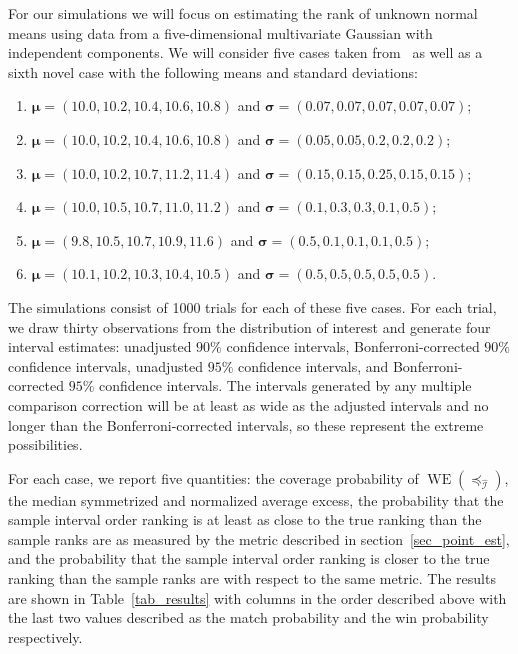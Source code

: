 \documentclass[12pt]{article}
\newcommand{\iord}{{\preceq_{\hat{\mathcal{I}}}}}
\newcommand{\WE}[1]{\operatorname{WE}(#1)}
\numberwithin{theorem}{section}
\begin{document}
For our simulations  we will focus on estimating the rank of unknown normal means using data from a five-dimensional multivariate Gaussian with independent components.  We will consider five cases taken from~\cite{klein2011rankingNormal} as well as a sixth novel case with the following means and standard deviations:
\begin{enumerate}

\item $\bm{\mu} = (10.0, 10.2, 10.4, 10.6, 10.8)$ and $\bm{\sigma} = (0.07, 0.07, 0.07, 0.07, 0.07)$;

\item $\bm{\mu} = (10.0, 10.2, 10.4, 10.6, 10.8)$ and $\bm{\sigma} = (0.05, 0.05, 0.2, 0.2, 0.2)$;

\item $\bm{\mu} = (10.0, 10.2, 10.7, 11.2, 11.4)$ and $\bm{\sigma} = (0.15, 0.15, 0.25, 0.15, 0.15)$;

\item $\bm{\mu} = (10.0, 10.5, 10.7, 11.0, 11.2)$ and $\bm{\sigma} = (0.1, 0.3, 0.3, 0.1, 0.5)$;

\item $\bm{\mu} = (9.8, 10.5, 10.7, 10.9, 11.6)$ and $\bm{\sigma} = (0.5, 0.1, 0.1, 0.1, 0.5)$;

\item $\bm{\mu} = (10.1, 10.2, 10.3, 10.4, 10.5)$ and $\bm{\sigma} = (0.5, 0.5, 0.5, 0.5, 0.5)$.

\end{enumerate}

The simulations consist of 1000 trials for each of these five cases.  For each trial, we draw thirty observations from the distribution of interest and generate four interval estimates: unadjusted $90\%$ confidence intervals, Bonferroni-corrected $90\%$ confidence intervals, unadjusted $95\%$ confidence intervals, and Bonferroni-corrected $95\%$ confidence intervals.  The intervals generated by any multiple comparison correction will be at least as wide as the adjusted intervals and no longer than the Bonferroni-corrected intervals, so these represent the extreme possibilities.

For each case, we report five quantities: the coverage probability of $\WE{\iord}$, the median symmetrized and normalized average excess, the probability that the sample interval order ranking is at least as close to the true ranking than the sample ranks are as measured by the metric described in section~\ref{sec_point_est}, and the probability that the sample interval order ranking is closer to the true ranking than the sample ranks are with respect to the same metric.  The results are shown in Table~\ref{tab_results} with columns in the order described above with the last two values described as the match probability and the win probability respectively.
\end{document}
